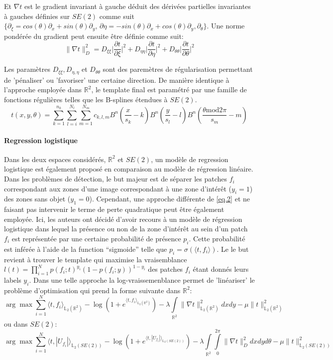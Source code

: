 \documentclass{article}
\begin{document}
Et $\nabla t$ est le gradient invariant à gauche déduit des dérivées partielles invariantes à gauches définies sur $SE(2)$
comme suit $\{\partial_{\xi} = cos(\theta)\partial_x + sin(\theta) \partial_y,\, \partial{\eta} = -sin(\theta) \partial_x + cos(\theta)
\partial_y, \partial_{\theta}\}$. Une norme pondérée du gradient peut ensuite être définie comme suit:
\[
    \lVert \nabla t \rVert_{D}^2 = D_{\xi \xi} \Big|\frac{\partial t}{\partial \xi} \Big|^2
    + D_{\eta \eta} \Big|\frac{\partial t}{\partial \eta}\Big|^2 + D_{\theta \theta} \Big|\frac{\partial t}{\partial \theta}\Big|^2
\]


Les paramètres $D_{\xi \xi}, D_{\eta, \eta}$ et $D_{\theta \theta}$ sont des paremètres de régularisation permettant de 'pénaliser' ou 'favoriser' une certaine direction.
De manière identique à l'approche employée dans $\mathbb{R}^2$, le template final est paramétré par une famille de fonctions
régulières telles que les B-splines étendues à $SE(2)$.
\[
    t(x, y, \theta) = \sum \limits_{k=1}^{n_k} \sum \limits_{l=i}^{N_l} \sum \limits_{m=1}^{N_m} c_{k,l,m} B^n \left (\frac{x}{s_k} - k \right )
    B^n \left (\frac{y}{s_l} - l \right) B^n \left (\frac{\theta \text{mod} 2\pi}{s_m} - m \right )
\]

\paragraph{Regression logistique}
Dans les deux espaces considérés, $\mathbb{R}^2$ et $SE(2)$, un modèle de regression logistique est également proposé en comparaison 
au modèle de régression linéaire. Dans les problèmes de détection, le but majeur est de séparer les patches $f_i$ correspondant aux zones d'une image correspondant à une 
zone d'intérêt ($y_i =1$) des zones sans objet ($y_1=0$). Cependant, une approche différente de \ref{eq.2} et ne faisant pas intervenir le terme de perte quadratique 
peut être également employée. Ici, les auteurs ont décidé d'avoir recours à un modèle de régression logistique dans lequel la présence ou non de 
la zone d'intérêt au sein d'un patch $f_i$ est représentée par une certaine probabilité de présence $p_i$. Cette probabilité est inférée à l'aide de
la function ``sigmoide'' telle que $p_i = \sigma(\langle t, f_i \rangle)$. Le le but revient à trouver le template qui maximise la vraisemblance $l(t) = 
\prod \limits_{i=1}^N p(f_i; t)^{y_i}(1 - p(f_i; y))^{1- y_i}$
des patches $f_i$ étant donnés leurs labels $y_i$. Dans une telle approche la log-vraissemenblance permet de 'linéariser' le problème d'optimisation qui prend la forme
suivante dans $\mathbb{R}^2$:
\[
    \arg \max \sum \limits_{i=1}^N \langle t, f_i \rangle_{\mathbb{L}_2(\mathbb{R}^2)} - \log \left ( 1 + e^{\langle t, f_i \rangle_{\mathbb{L}_2(\mathbb{R}^2)}}\right) - \lambda \int \limits_{\mathbb{R}^2} \lVert \nabla 
    t \rVert_{\mathbb{L}_2(\mathbb{R}^2)}^2 dx dy - \mu \lVert t \rVert_{\mathbb{L}_2(\mathbb{R}^2)}^2
\]
ou dans $SE(2)$:
\[
    \arg \max \sum \limits_{i=1}^N \langle t, |U_{f_i}| \rangle_{\mathbb{L}_2(SE(2))} - \log \left ( 1 + e^{\langle t, |U_{f_i}| \rangle_{\mathbb{L}_2(SE(2))}}\right) - \lambda \int \limits_{\mathbb{R}^2} \int \limits_{0}^{2\pi}\lVert \nabla 
    t \rVert_{D}^2 dx dy d\theta- \mu \lVert t \rVert_{\mathbb{L}_2(SE(2))}^2
\]
\end{document}
